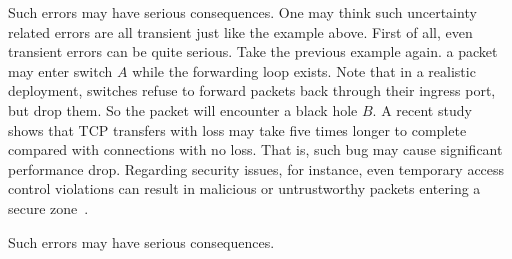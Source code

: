 Such errors may have serious consequences.  One may think such uncertainty
related errors are all transient just like the example above.  First of all,
even transient errors can be quite serious.  Take the previous example again.
a packet may enter switch $A$ while the forwarding loop exists. Note that in a
realistic deployment, switches refuse to forward packets back through
their ingress port, but drop them. So the packet will encounter a black hole $B$. 
A recent study~\cite{Flach2013} shows that TCP
transfers with loss may take five times longer to complete compared with
connections with no loss. That is, such bug may cause significant performance
drop. 
Regarding security issues, for instance, even temporary access control
violations can result in malicious or untrustworthy packets entering a secure
zone~\cite{Reitblatt2012}. 
\fi

Such errors may have serious consequences.

